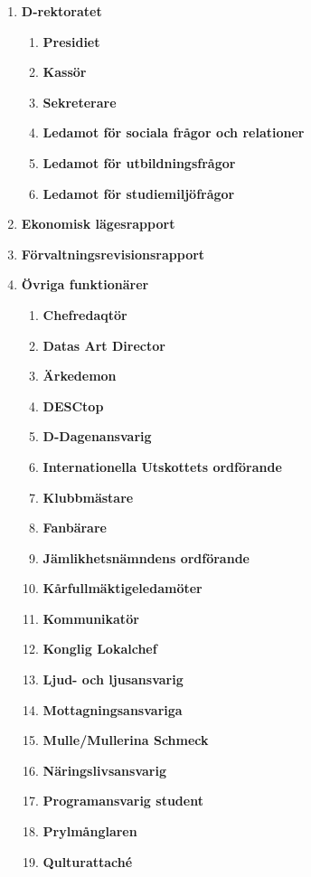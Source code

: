 \documentclass{dagordning}
\begin{document}
  \begin{enumerate}
    \item \textbf{D-rektoratet}
      \begin{enumerate}
        \item \textbf{Presidiet}
        \item \textbf{Kassör}
        \item \textbf{Sekreterare}
        \item \textbf{Ledamot för sociala frågor och relationer}
        \item \textbf{Ledamot för utbildningsfrågor}
        \item \textbf{Ledamot för studiemiljöfrågor}
      \end{enumerate}
    \item \textbf{Ekonomisk lägesrapport}
    \item \textbf{Förvaltningsrevisionsrapport}
    \item \textbf{Övriga funktionärer}
      \begin{enumerate}
      	\item \textbf{Chefredaqtör}
      	\item \textbf{Datas Art Director}
        \item \textbf{Ärkedemon}
        \item \textbf{DESCtop}
        \item \textbf{D-Dagenansvarig}
        \item \textbf{Internationella Utskottets ordförande}
        \item \textbf{Klubbmästare}
        \item \textbf{Fanbärare}
        \item \textbf{Jämlikhetsnämndens ordförande}
        \item \textbf{Kårfullmäktigeledamöter}
        \item \textbf{Kommunikatör}
        \item \textbf{Konglig Lokalchef}
        \item \textbf{Ljud- och ljusansvarig}
        \item \textbf{Mottagningsansvariga}
        \item \textbf{Mulle/Mullerina Schmeck}
        \item \textbf{Näringslivsansvarig}
        \item \textbf{Programansvarig student}
        \item \textbf{Prylmånglaren}
        \item \textbf{Qulturattaché}

\end{enumerate}
\end{enumerate}
\end{document}
